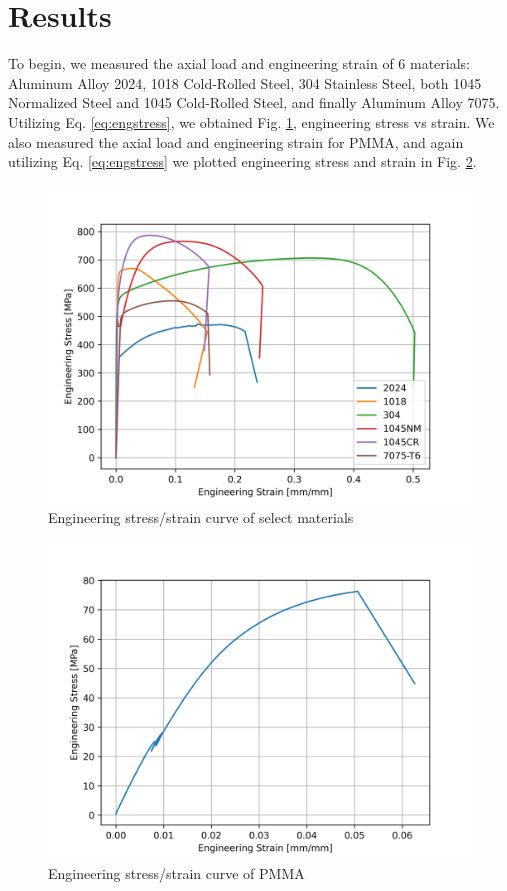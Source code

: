 \documentclass{article}
\begin{document}
\section{Results}

To begin, we measured the axial load and engineering strain of 6 materials: Aluminum Alloy 2024, 1018 Cold-Rolled Steel, 304 Stainless Steel, both 1045 Normalized Steel and 1045 Cold-Rolled Steel, and finally Aluminum Alloy 7075. Utilizing Eq. \ref{eq:engstress}, we obtained Fig. \ref{fig:q1all}, engineering stress vs strain. We also measured the axial load and engineering strain for PMMA, and again utilizing Eq. \ref{eq:engstress} we plotted engineering stress and strain in Fig. \ref{fig:q1pmma}.
\begin{figure}[!h!]
    \centering
    \includegraphics[width=0.6\linewidth]{plots/q1all.png}
    \caption{Engineering stress/strain curve of select materials}
    \label{fig:q1all}
\end{figure}

\begin{figure}[!h!]
    \centering
    \includegraphics[width=0.6\linewidth]{plots/q1_PMMA.png}
    \caption{Engineering stress/strain curve of PMMA}
    \label{fig:q1pmma}
\end{figure}
\end{document}
